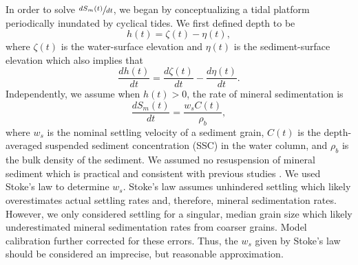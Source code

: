 In order to solve $\sfrac{dS_m(t)}{dt}$, we began by conceptualizing a tidal platform periodically inundated by cyclical tides. We first defined depth to be
\begin{equation}\label{eq:depth}
	h(t) = \zeta(t) - \eta(t),
\end{equation}
where $\zeta(t)$ is the water-surface elevation and $\eta(t)$ is the sediment-surface elevation which also implies that
\begin{equation}\label{eq:depth_dt}
	\frac{dh(t)}{dt} = \frac{d\zeta(t)}{dt} - \frac{d\eta(t)}{dt}.
\end{equation}
Independently, we assume when $h(t) > 0$, the rate of mineral sedimentation is
\begin{equation}\label{eq:sed_flux}
	\frac{dS_m(t)}{dt} = \frac{w_sC(t)}{\rho_b},
\end{equation}
where $w_s$ is the nominal settling velocity of a sediment grain, $C(t)$ is the depth-averaged suspended sediment concentration (SSC) in the water column, and $\rho_b$ is the bulk density of the sediment. We assumed no resuspension of mineral sediment which is practical and consistent with previous studies \citep{kroneMethodSimulatingMarsh1987, allenSaltmarshGrowthStratification1990, frenchNumericalSimulationVertical1993, temmermanModellingLongtermTidal2003, temmermanModellingEstuarineVariations2004}. We used Stoke's law to determine $w_s$. Stoke's law assumes unhindered settling which likely overestimates actual settling rates and, therefore, mineral sedimentation rates. However, we only considered settling for a singular, median grain size which likely underestimated mineral sedimentation rates from coarser grains. Model calibration further corrected for these errors. Thus, the $w_s$ given by Stoke's law should be considered an imprecise, but reasonable approximation. 

